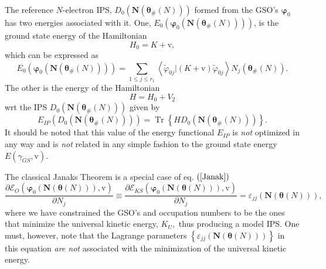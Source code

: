 \documentclass[aps,preprint]{revtex4}%
\begin{document}
The reference $N$-electron IPS, $D_{0}\left(  \mathbf{N}\left(  \mathbf{\theta
}_{\#}\left(  N\right)  \right)  \right)  $ formed from the GSO's
$\mathbf{\varphi}_{0}$ has two energies associated with it. One, $E_{0}\left(
\mathbf{\varphi}_{0}\left(  \mathbf{N}\left(  \mathbf{\theta}_{\#}\left(
N\right)  \right)  \right)  \right)  $, is the ground state energy of the
Hamiltonian%
\begin{equation}
H_{0}=K+\mathrm{v},
\end{equation}
which can be expressed as
\begin{equation}
E_{0}\left(  \mathbf{\varphi}_{0}\left(  \mathbf{N}\left(  \mathbf{\theta
}_{\#}\left(  N\right)  \right)  \right)  \right)  =\sum_{1\leq j\leq r_{1}%
}\left\langle \tilde{\varphi}_{0j}\left\vert \left(  K+\mathrm{v}\right)
\right.  \tilde{\varphi}_{0j}\right\rangle N_{j}\left(  \mathbf{\theta}%
_{\#}\left(  N\right)  \right)  .
\end{equation}
The other is the energy of the Hamiltonian
\begin{equation}
H=H_{0}+V_{2}%
\end{equation}
wrt the IPS $D_{0}\left(  \mathbf{N}\left(  \mathbf{\theta}_{\#}\left(
N\right)  \right)  \right)  $ given by
\begin{equation}
E_{IP}\left(  D_{0}\left(  \mathbf{N}\left(  \mathbf{\theta}_{\#}\left(
N\right)  \right)  \right)  \right)  =\operatorname{Tr}\left\{  HD_{0}\left(
\mathbf{N}\left(  \mathbf{\theta}_{\#}\left(  N\right)  \right)  \right)
\right\}  .
\end{equation}
It should be noted that this value of the energy functional $E_{IP}$ is
\emph{not }optimized in any way and is \emph{not }related in any simple
fashion to the ground state energy $E\left(  \gamma_{GS}\mathbf{,}%
\mathrm{v}\right)  .$

The classical Janaks Theorem is a special case of eq. $\left(  \ref{Janak}%
\right)  $
\begin{equation}
\frac{\partial\mathcal{E}_{O}\left(  \mathbf{\varphi}_{0}\left(
\mathbf{N}\left(  \mathbf{\theta}\left(  N\right)  \right)  \right)
,\mathrm{v}\right)  }{\partial N_{j}}\equiv\frac{\partial\mathcal{E}%
_{KS}\left(  \mathbf{\varphi}_{0}\left(  \mathbf{N}\left(  \mathbf{\theta
}\left(  N\right)  \right)  \right)  ,\mathrm{v}\right)  }{\partial N_{j}%
}=\varepsilon_{jj}\left(  \mathbf{N}\left(  \mathbf{\theta}\left(  N\right)
\right)  \right)  , \label{ClassJanak}%
\end{equation}
where we have constrained the GSO's and occupation numbers to be the ones that
minimize the universal kinetic energy, $K_{U},$ thus producing a model IPS.
One must, however, note that the Lagrange parameters $\left\{  \varepsilon
_{jj}\left(  \mathbf{N}\left(  \mathbf{\theta}\left(  N\right)  \right)
\right)  \right\}  $ in this equation \emph{are not }associated with the
minimization of the universal kinetic energy.\emph{ }
\end{document}
